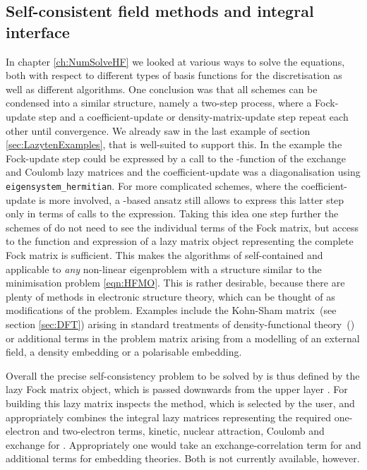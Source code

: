 \subsection{Self-consistent field methods and integral interface}
\label{sec:GscfGint}
In chapter \vref{ch:NumSolveHF} we looked at various ways to solve the
\HF equations, both with respect to different types of basis functions
for the discretisation as well as different \SCF algorithms.
One conclusion was that all \SCF schemes can be
condensed into a similar structure,
namely a two-step process,
where a Fock-update step and a coefficient-update or density-matrix-update step
repeat each other until convergence.
We already saw in the last example of section
\vref{sec:LazytenExamples},
that \lazyten is well-suited to support this.
In the example the Fock-update step could be expressed
by a call to the \update-function of the exchange and Coulomb lazy matrices
and the coefficient-update was
a diagonalisation using \texttt{eigensystem\_hermitian}.
For more complicated \SCF schemes, where the coefficient-update is more involved,
a \contraction-based ansatz still allows to express
this latter step only in terms of calls to the \contraction expression.
Taking this idea one step further the \SCF schemes
of \gscf do not need to see the individual terms of the Fock matrix,
but access to the \update function and \contraction expression
of a lazy matrix object representing the complete Fock matrix is sufficient.
This makes the algorithms of \gscf self-contained
and applicable to \emph{any} non-linear eigenproblem
with a structure similar to the \HF minimisation problem \eqref{eqn:HFMO}.
This is rather desirable,
because there are plenty of methods in electronic structure theory,
which can be thought of as modifications of the \HF problem.
Examples include the Kohn-Sham matrix~(see section \vref{sec:DFT})
arising in standard treatments of density-functional theory~(\DFT)
or additional terms in the problem matrix
arising from a modelling of an external field,
a density embedding or a polarisable embedding.

Overall the precise self-consistency problem to be solved by \gscf
is thus defined by the lazy Fock matrix object,
which is passed downwards from the upper layer \molsturm.
For building this lazy matrix
\molsturm inspects the method, which is selected by the user,
and appropriately combines the integral lazy matrices
representing the required one-electron and two-electron terms,
\ie kinetic, nuclear attraction, Coulomb and exchange for \HF.
Appropriately one would take an exchange-correlation term for \DFT
and additional terms for embedding theories.
Both is not currently available, however.


